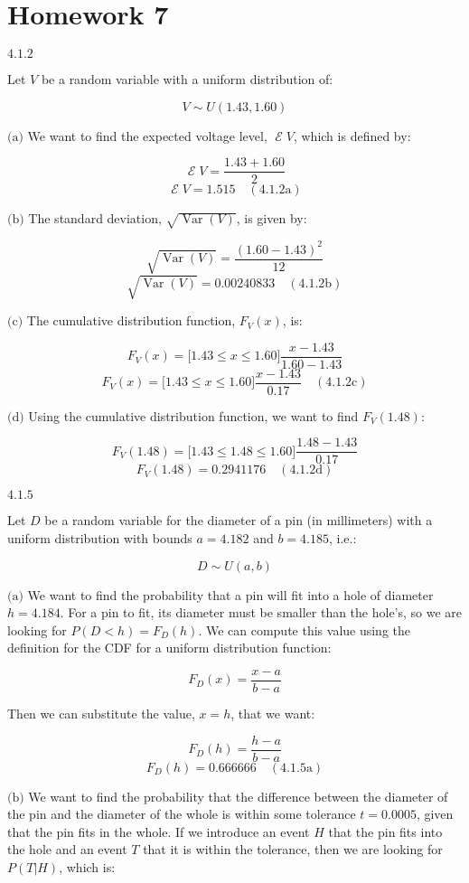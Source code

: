 \documentclass{article}
\newcommand{\problem}[2]{$\boxed{\text{#1.#2}}$}
\newcommand{\subproblem}[3]{$\boxed{\text{(#3)}}$}
\newcommand{\subsolution}[4]{\boxed{#4\quad(\text{#1.#2#3})}}
\DeclareMathOperator{\var}{Var}
\DeclareMathOperator{\E}{\mathcal{E}}
\begin{document}
\section*{Homework 7}

%
\problem{4.1}{2}

Let $V$ be a random variable with a uniform distribution of:

\[
V\sim U(1.43, 1.60)
\]

%
\subproblem{4.1}{2}{a} We want to find the expected voltage level,
$\E{}V$, which is defined by:

\[
\E V=\frac{1.43+1.60}{2}
\] \[
\subsolution{4.1}{2}{a}{\E V=1.515}
\]

%
\subproblem{4.1}{2}{b} The standard deviation, $\sqrt{\var(V)}$, is
given by:

\[
\sqrt{\var(V)}=\frac{(1.60-1.43)^2}{12}
\] \[
\subsolution{4.1}{2}{b}{\sqrt{\var(V)}=0.00240833}
\]

%
\subproblem{4.1}{2}{c} The cumulative distribution function, $F_V(x)$,
is:

\[
F_V(x)=\lbrack1.43\le x\le1.60\rbrack\frac{x-1.43}{1.60-1.43}
\] \[
\subsolution{4.1}{2}{c}{F_V(x)=\lbrack1.43\le x\le1.60\rbrack\frac{x-1.43}{0.17}}
\]

%
\subproblem{4.1}{2}{d} Using the cumulative distribution function, we
want to find $F_V(1.48)$:

\[
F_V(1.48)=\lbrack1.43\le 1.48\le1.60\rbrack\frac{1.48-1.43}{0.17}
\] \[
\subsolution{4.1}{2}{d}{F_V(1.48)=0.2941176}
\]

%
\problem{4.1}{5}

Let $D$ be a random variable for the diameter of a pin (in
millimeters) with a uniform distribution with bounds $a=4.182$ and
$b=4.185$, i.e.:

\[
D\sim U(a,b)
\]

%
\subproblem{4.1}{5}{a} We want to find the probability that a pin will
fit into a hole of diameter $h=4.184$. For a pin to fit, its diameter
must be smaller than the hole's, so we are looking for
$P(D<h)=F_D(h)$. We can compute this value using the definition for
the CDF for a uniform distribution function:

\[
F_D(x)=\frac{x-a}{b-a}
\]

Then we can substitute the value, $x=h$, that we want:

\[
F_D(h)=\frac{h-a}{b-a}
\] \[
\subsolution{4.1}{5}{a}{F_D(h)=0.666666}
\]

%
\subproblem{4.1}{5}{b} We want to find the probability that the
difference between the diameter of the pin and the diameter of the
whole is within some tolerance $t=0.0005$, given that the pin fits in
the whole. If we introduce an event $H$ that the pin fits into the
hole and an event $T$ that it is within the tolerance, then we are
looking for $P(T|H)$, which is:
\end{document}
